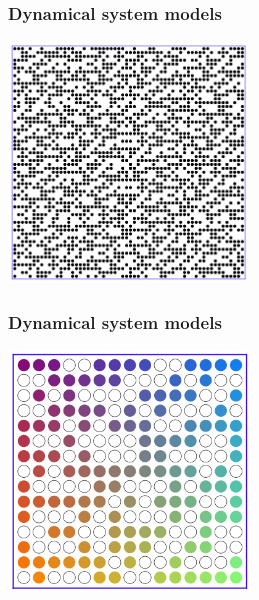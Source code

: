 \begin{frame}
  \frametitle{Dynamical system models}
  
  \begin{center}
   \includegraphics[height=64mm]{pic6.jpg}
  \end{center}
  
\end{frame}


\begin{frame}
  \frametitle{Dynamical system models}
  
  \begin{center}
   \includegraphics[height=64mm]{pic7.jpg}
  \end{center}
  
\end{frame}



